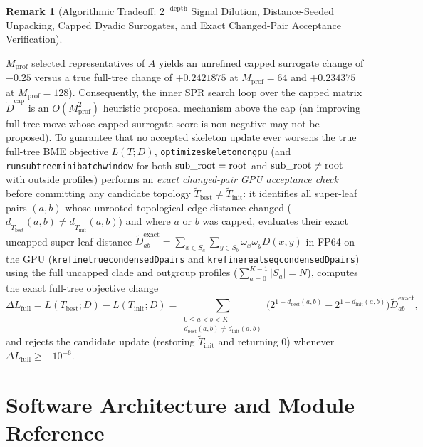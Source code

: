 \documentclass[11pt,a4paper]{article}
\makeatletter
\DeclareRobustCommand{\_}{\ifmmode\nfss@text{\textunderscore}\else\textunderscore\allowbreak\fi}
\theoremstyle{definition}
\newtheorem{remark}[theorem]{Remark}
\makeatother
\begin{document}
\begin{remark}[Algorithmic Tradeoff: $2^{-\text{depth}}$ Signal Dilution, Distance-Seeded Unpacking, Capped Dyadic Surrogates, and Exact Changed-Pair Acceptance Verification]
\begin{enumerate}
$M_{\text{prof}}$ selected representatives of $A$ yields an unrefined capped surrogate change of $-0.25$ versus a true full-tree change of $+0.2421875$ at $M_{\text{prof}} = 64$ and $+0.234375$ at $M_{\text{prof}} = 128$). Consequently, the inner SPR search loop over the capped matrix $\widetilde{D}^{\text{cap}}$ is an $O(M_{\text{prof}}^2)$ heuristic proposal mechanism above the cap (an improving full-tree move whose capped surrogate score is non-negative may not be proposed). To guarantee that no accepted skeleton update ever worsens the true full-tree BME objective $L(T; D)$, \texttt{optimize\_skeleton\_on\_gpu} (and \texttt{run\_subtree\_minibatch\_window} for both $\text{sub\_root} = \text{root}$ and $\text{sub\_root} \neq \text{root}$ with outside profiles) performs an \emph{exact changed-pair GPU acceptance check} before committing any candidate topology $\widetilde{T}_{\text{best}} \neq \widetilde{T}_{\text{init}}$: it identifies all super-leaf pairs $(a, b)$ whose unrooted topological edge distance changed ($d_{\widetilde{T}_{\text{best}}}(a, b) \neq d_{\widetilde{T}_{\text{init}}}(a, b)$) and where $a$ or $b$ was capped, evaluates their exact uncapped super-leaf distance $\widetilde{D}^{\text{exact}}_{ab} = \sum_{x \in S_a} \sum_{y \in S_b} \omega_x \omega_y D(x, y)$ in FP64 on the GPU (\texttt{k\_refine\_true\_condensed\_D\_pairs} and \texttt{k\_refine\_real\_seq\_condensed\_D\_pairs}) using the full uncapped clade and outgroup profiles ($\sum_{a=0}^{K-1} |S_a| = N$), computes the exact full-tree objective change
    \begin{equation}
    \Delta L_{\text{full}} = L(T_{\text{best}}; D) - L(T_{\text{init}}; D) = \sum_{\substack{0 \le a < b < K \\ d_{\text{best}}(a,b) \neq d_{\text{init}}(a,b)}} \Big(2^{1 - d_{\text{best}}(a,b)} - 2^{1 - d_{\text{init}}(a,b)}\Big) \widetilde{D}^{\text{exact}}_{ab},
    \end{equation}
    and rejects the candidate update (restoring $\widetilde{T}_{\text{init}}$ and returning $0$) whenever $\Delta L_{\text{full}} \ge -10^{-6}$.
\end{enumerate}
\end{remark}

\section{Software Architecture and Module Reference}
\label{sec:software}
\end{document}
